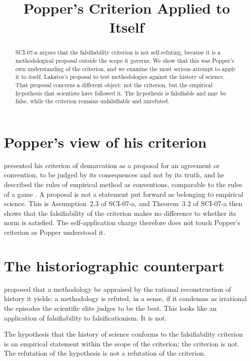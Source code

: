 \documentclass{situationist-preprint}
\title{Popper's Criterion Applied to Itself}
\begin{document}
\maketitle

\begin{abstract}
SCI-07-a argues that the falsifiability criterion is not self-refuting, because it is a methodological proposal outside the scope it governs. We show that this was Popper's own understanding of the criterion, and we examine the most serious attempt to apply it to itself, Lakatos's proposal to test methodologies against the history of science. That proposal concerns a different object: not the criterion, but the empirical hypothesis that scientists have followed it. The hypothesis is falsifiable and may be false, while the criterion remains unfalsifiable and unrefuted.
\end{abstract}

\section{Popper's view of his criterion}\label{s:popper}

\citet[§4]{Popper1959} presented his criterion of demarcation as a proposal for an agreement or convention, to be judged by its consequences and not by its truth, and he described the rules of empirical method as conventions, comparable to the rules of a game \citep[§§10--11]{Popper1959}. A proposal is not a statement put forward as belonging to empirical science. This is Assumption~2.3 of SCI-07-a, and Theorem~3.2 of SCI-07-a then shows that the falsifiability of the criterion makes no difference to whether its norm is satisfied. The self-application charge therefore does not touch Popper's criterion as Popper understood it.

\section{The historiographic counterpart}\label{s:lakatos}

\citet{Lakatos1971} proposed that a methodology be appraised by the rational reconstruction of history it yields: a methodology is refuted, in a sense, if it condemns as irrational the episodes the scientific elite judges to be the best. This looks like an application of falsifiability to falsificationism. It is not.

\begin{proposition}\label{p:counterpart}
The hypothesis that the history of science conforms to the falsifiability criterion is an empirical statement within the scope of the criterion; the criterion is not. The refutation of the hypothesis is not a refutation of the criterion.
\end{proposition}
\end{document}
